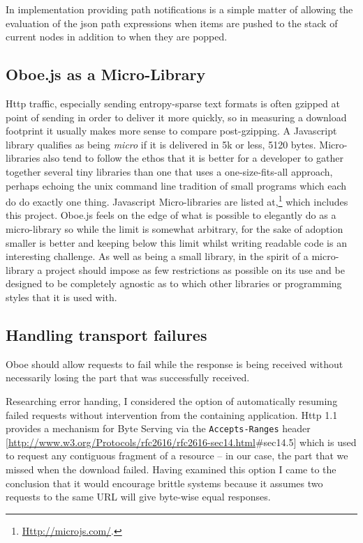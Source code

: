 \documentclass[]{article}
\begin{document}
In implementation providing path notifications is a simple matter of
allowing the evaluation of the json path expressions when items are
pushed to the stack of current nodes in addition to when they are
popped.

\subsection{Oboe.js as a Micro-Library}

Http traffic, especially sending entropy-sparse text formats is often
gzipped at point of sending in order to deliver it more quickly, so in
measuring a download footprint it usually makes more sense to compare
post-gzipping. A Javascript library qualifies as being \emph{micro} if
it is delivered in 5k or less, 5120 bytes. Micro-libraries also tend to
follow the ethos that it is better for a developer to gather together
several tiny libraries than one that uses a one-size-fits-all approach,
perhaps echoing the unix command line tradition of small programs which
each do do exactly one thing. Javascript Micro-libraries are listed
at,\footnote{\href{http://microjs.com/}{Http://microjs.com/}.} which
includes this project. Oboe.js feels on the edge of what is possible to
elegantly do as a micro-library so while the limit is somewhat
arbitrary, for the sake of adoption smaller is better and keeping below
this limit whilst writing readable code is an interesting challenge. As
well as being a small library, in the spirit of a micro-library a
project should impose as few restrictions as possible on its use and be
designed to be completely agnostic as to which other libraries or
programming styles that it is used with.

\subsection{Handling transport failures}

Oboe should allow requests to fail while the response is being received
without necessarily losing the part that was successfully received.

Researching error handing, I considered the option of automatically
resuming failed requests without intervention from the containing
application. Http 1.1 provides a mechanism for Byte Serving via the
\texttt{Accepts-Ranges} header
{[}\url{http://www.w3.org/Protocols/rfc2616/rfc2616-sec14.html}\#sec14.5{]}
which is used to request any contiguous fragment of a resource -- in our
case, the part that we missed when the download failed. Having examined
this option I came to the conclusion that it would encourage brittle
systems because it assumes two requests to the same URL will give
byte-wise equal responses.
\end{document}
